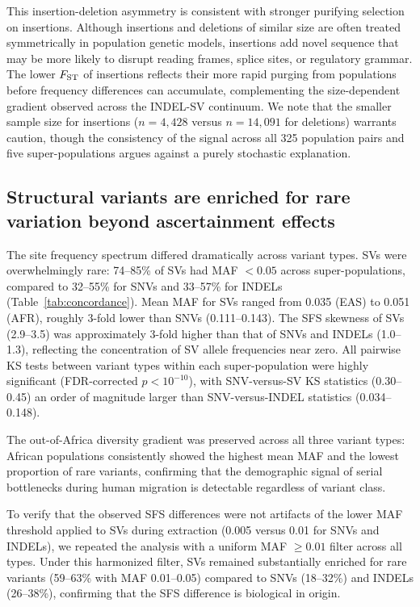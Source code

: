 This insertion-deletion asymmetry is consistent with stronger purifying selection on insertions. Although insertions and deletions of similar size are often treated symmetrically in population genetic models, insertions add novel sequence that may be more likely to disrupt reading frames, splice sites, or regulatory grammar. The lower $F_\mathrm{ST}$ of insertions reflects their more rapid purging from populations before frequency differences can accumulate, complementing the size-dependent gradient observed across the INDEL-SV continuum. We note that the smaller sample size for insertions ($n = 4{,}428$ versus $n = 14{,}091$ for deletions) warrants caution, though the consistency of the signal across all 325 population pairs and five super-populations argues against a purely stochastic explanation.

\subsection*{Structural variants are enriched for rare variation beyond ascertainment effects}

The site frequency spectrum differed dramatically across variant types. SVs were overwhelmingly rare: 74--85\% of SVs had MAF $< 0.05$ across super-populations, compared to 32--55\% for SNVs and 33--57\% for INDELs (Table~\ref{tab:concordance}). Mean MAF for SVs ranged from 0.035 (EAS) to 0.051 (AFR), roughly 3-fold lower than SNVs (0.111--0.143). The SFS skewness of SVs (2.9--3.5) was approximately 3-fold higher than that of SNVs and INDELs (1.0--1.3), reflecting the concentration of SV allele frequencies near zero. All pairwise KS tests between variant types within each super-population were highly significant (FDR-corrected $p < 10^{-10}$), with SNV-versus-SV KS statistics (0.30--0.45) an order of magnitude larger than SNV-versus-INDEL statistics (0.034--0.148).

The out-of-Africa diversity gradient was preserved across all three variant types: African populations consistently showed the highest mean MAF and the lowest proportion of rare variants, confirming that the demographic signal of serial bottlenecks during human migration is detectable regardless of variant class.

To verify that the observed SFS differences were not artifacts of the lower MAF threshold applied to SVs during extraction (0.005 versus 0.01 for SNVs and INDELs), we repeated the analysis with a uniform MAF $\geq 0.01$ filter across all types. Under this harmonized filter, SVs remained substantially enriched for rare variants (59--63\% with MAF 0.01--0.05) compared to SNVs (18--32\%) and INDELs (26--38\%), confirming that the SFS difference is biological in origin.

